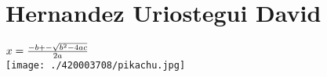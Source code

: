 \chapter{Hernandez Uriostegui David}
$x = { -b +- \sqrt{b^2 - 4ac}\over 2a}$\\
\texttt{[image: ./420003708/pikachu.jpg]}
